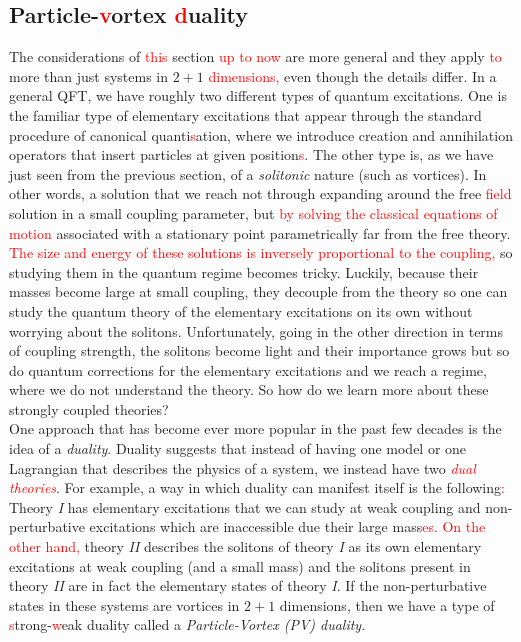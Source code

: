     \subsection{Particle-\textcolor{red}{v}ortex \textcolor{red}{d}uality}
    The considerations of \textcolor{red}{this} section \textcolor{red}{up to now} are more general and they apply \textcolor{red}{to} more than just systems in $2+1$ \textcolor{red}{dimensions,} even though the details differ. In a general QFT, we have roughly two different types of quantum excitations. One is the familiar type of elementary excitations that appear through the standard procedure of canonical quanti\textcolor{red}{s}ation, where we introduce creation and annihilation operators that insert particles at \colorbox{red}{ } given position\textcolor{red}{s}. The other type is, as we have just seen from the previous section, of a \textit{solitonic} nature (such as vortices). In other words, a solution that we reach not through expanding around the free \textcolor{red}{field} solution in a small coupling parameter, but \textcolor{red}{by solving the classical equations of motion} associated with a stationary point parametrically far from the free theory. \textcolor{red}{The size and energy of these solutions is inversely proportional to the coupling}\textcolor{red}{,} so studying them in the quantum regime becomes tricky. Luckily, because their masses become large at small coupling, they decouple from the theory so one can study the quantum theory of the elementary excitations on its own without worrying about the solitons. Unfortunately, going in the other direction in terms of coupling strength, the solitons become light and their importance grows but so do quantum corrections for the elementary excitations and we reach a regime, where we do not understand the theory. So how do we learn more about these strongly coupled theories? \\
    \indent One approach that has become ever more popular in the past few decades is the idea of a \textit{duality}. Duality suggests that instead of having one model or one Lagrangian that describes the physics of a system, we instead have two \textcolor{red}{\textit{dual theories}}. For example, a way in which duality can manifest itself is the following\textcolor{red}{:}\\
    \indent Theory \textit{I} has elementary excitations that we can study at weak coupling and non-perturbative excitations which are inaccessible due their large mass\textcolor{red}{es}. \textcolor{red}{On the other hand,} theory \textit{II} describes the solitons of theory \textit{I} as its own elementary excitations at weak coupling (and a small mass) and the solitons present in theory \textit{II} are in fact the elementary states of theory \textit{I}. If the non-perturbative states in these systems are vortices in $2+1$ dimensions, then we have a type of \textcolor{red}{s}trong-\textcolor{red}{w}eak duality called a \textit{Particle-Vortex (PV) duality}. \\
